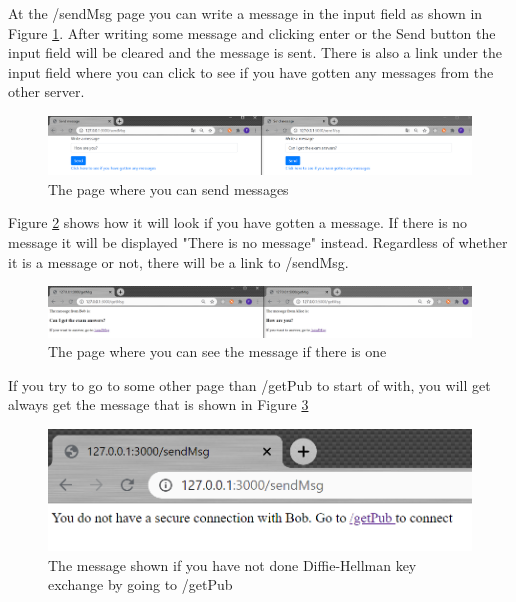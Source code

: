 \documentclass[12pt, letterpaper]{article}
\begin{document}
At the /sendMsg page you can write a message in the input field as shown in Figure \ref{fig:sendmsgpage}. After writing some message and clicking enter or the Send button the input field will be cleared and the message is sent. There is also a link under the input field where you can click to see if you have gotten any messages from the other server.

\begin{figure}[H]
  \hspace*{-50px}\includegraphics[width=500px]{code_snippets/sendmsgpage.PNG}
  \caption{The page where you can send messages}
  \label{fig:sendmsgpage}
\end{figure}

Figure \ref{fig:getmsg} shows how it will look if you have gotten a message. If there is no message it will be displayed "There is no message" instead. Regardless of whether it is a message or not, there will be a link to /sendMsg. 

\begin{figure}[H]
  \hspace*{-50px}\includegraphics[width=500px]{code_snippets/getmsgpage.PNG}
  \caption{The page where you can see the message if there is one}
  \label{fig:getmsg}
\end{figure}

If you try to go to some other page than /getPub to start of with, you will get always get the message that is shown in Figure \ref{fig:notsecure}

\begin{figure}[H]
  \includegraphics[width=\linewidth]{code_snippets/notsecure.PNG}
  \caption{The message shown if you have not done Diffie-Hellman key exchange by going to /getPub}
  \label{fig:notsecure}
\end{figure}
\end{document}
